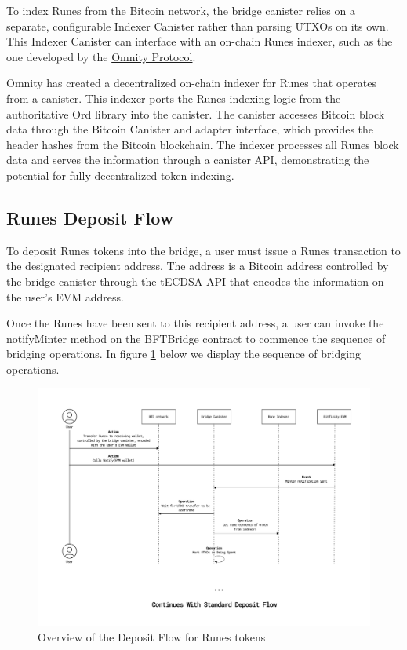 \documentclass{article}
\begin{document}
To index Runes from the Bitcoin network, the bridge canister relies on a separate, configurable Indexer Canister rather than parsing UTXOs on its own. This Indexer Canister can interface with an on-chain Runes indexer, such as the one developed by the \href{https://github.com/octopus-network/ord-canister}{Omnity Protocol}.

Omnity has created a decentralized on-chain indexer for Runes that operates from a canister. This indexer ports the Runes indexing logic from the authoritative Ord library into the canister. The canister accesses Bitcoin block data through the Bitcoin Canister and adapter interface, which provides the header hashes from the Bitcoin blockchain. The indexer processes all Runes block data and serves the information through a canister API, demonstrating the potential for fully decentralized token indexing.

\subsection{Runes Deposit Flow}

To deposit Runes tokens into the bridge, a user must issue a Runes transaction to the designated recipient address. The address is a Bitcoin address controlled by the bridge canister through the tECDSA API that encodes the information on the user's EVM address.

Once the Runes have been sent to this recipient address, a user can invoke the notifyMinter method on the BFTBridge contract to commence the sequence of bridging operations. In figure \ref{fig:runes} below we display the sequence of bridging operations. 


\begin{figure}[H]
    \centering
    \includegraphics[width=1\textwidth]{runes.png}
    \caption{Overview of the Deposit Flow for Runes tokens}
    \label{fig:runes}
\end{figure}
\end{document}
